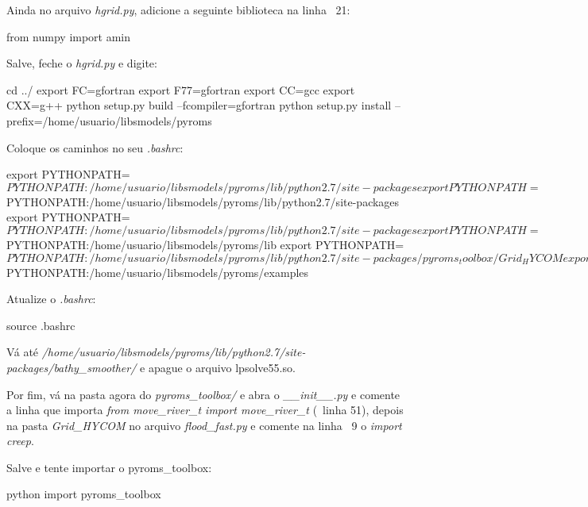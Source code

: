 \noindent Ainda no arquivo \textit{hgrid.py}, adicione a seguinte biblioteca na linha ~21:
\bigskip

\begin{bashcode}
from numpy import amin
\end{bashcode}
\bigskip

\noindent Salve, feche o \textit{hgrid.py} e digite:
\bigskip

\begin{bashcode}
cd ../
export FC=gfortran
export F77=gfortran
export CC=gcc
export CXX=g++
python setup.py build --fcompiler=gfortran
python setup.py install --prefix=/home/usuario/libsmodels/pyroms
\end{bashcode}
\bigskip

\noindent Coloque os caminhos no seu \textit{.bashrc}:
\bigskip

\begin{bashcode}[fontsize=\tiny]
export PYTHONPATH=$PYTHONPATH:/home/usuario/libsmodels/pyroms/lib/python2.7/site-packages
export PYTHONPATH=$PYTHONPATH:/home/usuario/libsmodels/pyroms/lib/python2.7/site-packages
export PYTHONPATH=$PYTHONPATH:/home/usuario/libsmodels/pyroms/lib/python2.7/site-packages
export PYTHONPATH=$PYTHONPATH:/home/usuario/libsmodels/pyroms/lib
export PYTHONPATH=$PYTHONPATH:/home/usuario/libsmodels/pyroms/lib/python2.7/site-packages/pyroms_toolbox/Grid_HYCOM
export PYTHONPATH=$PYTHONPATH:/home/usuario/libsmodels/pyroms/examples
\end{bashcode}
\bigskip

\noindent Atualize o \textit{.bashrc}:
\bigskip
\begin{bashcode}
source .bashrc
\end{bashcode}
\bigskip

\noindent Vá até \textit{/home/usuario/libsmodels/pyroms/lib/python2.7/site-packages/bathy\_smoother/} e apague o arquivo lpsolve55.so.
\bigskip

\noindent Por fim, vá na pasta agora do \textit{pyroms\_toolbox/} e abra o \textit{\_\_init\_\_.py} e comente a linha que importa \textit{from move\_river\_t import move\_river\_t} (~linha 51), depois na pasta \textit{Grid\_HYCOM} no arquivo \textit{flood\_fast.py} e comente na linha ~9 o \textit{import creep}.
\bigskip

\noindent Salve e tente importar o pyroms\_toolbox:
\bigskip

\begin{bashcode}
python
import pyroms_toolbox
\end{bashcode}
\bigskip 

